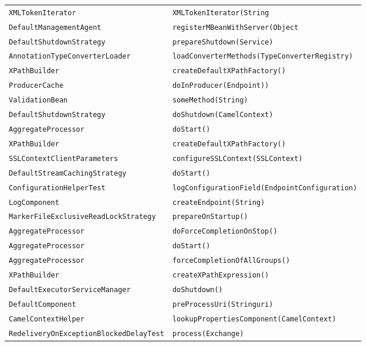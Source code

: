 \begin{center}
\begin{longtable}{ll}
\lstinline/XMLTokenIterator/&{\lstinline/XMLTokenIterator(String/}\\
\lstinline/DefaultManagementAgent/&{\lstinline/registerMBeanWithServer(Object/}\\
\lstinline/DefaultShutdownStrategy/&{\lstinline/prepareShutdown(Service)/}\\
\lstinline/AnnotationTypeConverterLoader/&{\lstinline/loadConverterMethods(TypeConverterRegistry)/}\\
\lstinline/XPathBuilder/&{\lstinline/createDefaultXPathFactory()/}\\
\lstinline/ProducerCache/&{\lstinline/doInProducer(Endpoint))/}\\
\lstinline/ValidationBean/&{\lstinline/someMethod(String)/}\\
\lstinline/DefaultShutdownStrategy/&{\lstinline/doShutdown(CamelContext)/}\\
\lstinline/AggregateProcessor/&{\lstinline/doStart()/}\\
\lstinline/XPathBuilder/&{\lstinline/createDefaultXPathFactory()/}\\
\lstinline/SSLContextClientParameters/&{\lstinline/configureSSLContext(SSLContext)/}\\
\lstinline/DefaultStreamCachingStrategy/&{\lstinline/doStart()/}\\
\lstinline/ConfigurationHelperTest/&{\lstinline/logConfigurationField(EndpointConfiguration)/}\\
\lstinline/LogComponent/&{\lstinline/createEndpoint(String)/}\\
\lstinline/MarkerFileExclusiveReadLockStrategy/&{\lstinline/prepareOnStartup()/}\\
\lstinline/AggregateProcessor/&{\lstinline/doForceCompletionOnStop()/}\\
\lstinline/AggregateProcessor/&{\lstinline/doStart()/}\\
\lstinline/AggregateProcessor/&{\lstinline/forceCompletionOfAllGroups()/}\\
\lstinline/XPathBuilder/&{\lstinline/createXPathExpression()/}\\
\lstinline/DefaultExecutorServiceManager/&{\lstinline/doShutdown()/}\\
\lstinline/DefaultComponent/&{\lstinline/preProcessUri(Stringuri)/}\\
\lstinline/CamelContextHelper/&{\lstinline/lookupPropertiesComponent(CamelContext)/}\\
\lstinline/RedeliveryOnExceptionBlockedDelayTest/&{\lstinline/process(Exchange)/}\\

\end{longtable}
\end{center}
